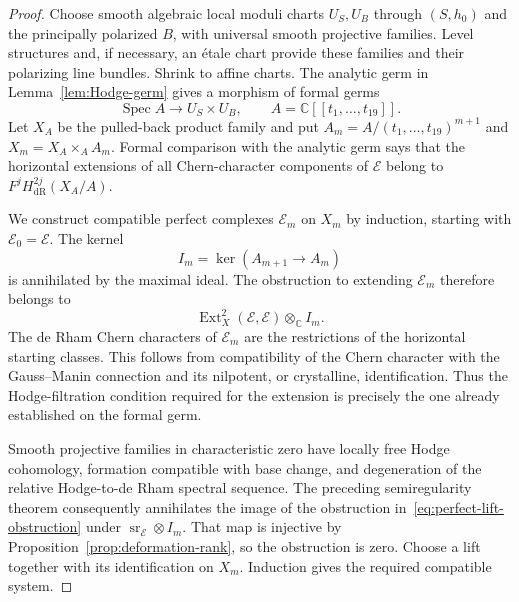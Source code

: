 \documentclass[11pt]{article}
\numberwithin{equation}{section}
\theoremstyle{definition}
\theoremstyle{remark}
\begin{document}
\begin{proof}
Choose smooth algebraic local moduli charts $U_S,U_B$ through
$(S,h_0)$ and the principally polarized $B$, with universal smooth
projective families. Level structures and, if necessary, an
\'etale chart provide these families and their polarizing line
bundles. Shrink to affine charts. The analytic germ in
Lemma~\ref{lem:Hodge-germ} gives a morphism of formal germs
\[
 \operatorname{Spec} A\longrightarrow U_S\times U_B,\qquad
 A=\mathbb C[[t_1,\ldots,t_{19}]].
\]
Let $X_A$ be the pulled-back product family and put
$A_m=A/(t_1,\ldots,t_{19})^{m+1}$ and $X_m=X_A\times_A A_m$.
Formal comparison with the analytic germ says that the horizontal
extensions of all Chern-character components of $\mathcal E$
belong to $F^jH^{2j}_{\mathrm{dR}}(X_A/A)$.

We construct compatible perfect complexes $\mathcal E_m$ on $X_m$
by induction, starting with $\mathcal E_0=\mathcal E$.
The kernel
\[
 I_m=\ker(A_{m+1}\to A_m)
\]
is annihilated by the maximal ideal. The obstruction to extending
$\mathcal E_m$ therefore belongs to
\begin{equation}\label{eq:perfect-lift-obstruction}
 \operatorname{Ext}^2_X(\mathcal E,\mathcal E)\otimes_\mathbb C I_m.
\end{equation}
The de Rham Chern characters of $\mathcal E_m$ are the restrictions
of the horizontal starting classes. This follows from compatibility
of the Chern character with the Gauss--Manin connection and its
nilpotent, or crystalline, identification. Thus the Hodge-filtration
condition required for the extension is precisely the one already
established on the formal germ.

Smooth projective families in characteristic zero have locally
free Hodge cohomology, formation compatible with base change, and
degeneration of the relative Hodge-to-de Rham spectral sequence.
The preceding semiregularity theorem consequently annihilates the
image of the obstruction in~\eqref{eq:perfect-lift-obstruction} under
$\operatorname{sr}_{\mathcal E}\otimes I_m$. That map is injective
by Proposition~\ref{prop:deformation-rank}, so the obstruction is
zero. Choose a lift together with its identification on $X_m$.
Induction gives the required compatible system.


\end{proof}
\end{document}

